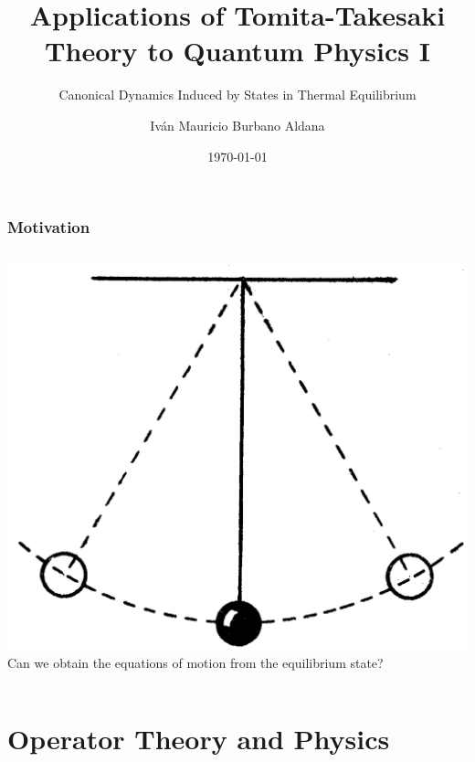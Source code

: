 \documentclass{beamer}
\title[Tomita-Takesaki and Quantum]{Applications of Tomita-Takesaki Theory to Quantum Physics I\nocite{Burbano2017}}
\subtitle{Canonical Dynamics Induced by States in Thermal Equilibrium}
\author[Iván Burbano]{Iván Mauricio Burbano Aldana}
\institute{Universidad de los Andes}
\date{\today}
\begin{document}
\begin{frame}
	\titlepage
\end{frame}

\begin{frame}
	\frametitle{Motivation}
	\begin{columns}
		\includegraphics[width=\textwidth]{images/pendulum.png}
		Can we obtain the equations of motion from the equilibrium state?
		\vspace{1cm}
		
	\end{columns}
\end{frame}

\begin{frame}
	\tableofcontents
\end{frame}

\section{Operator Theory and Physics}
\end{document}
